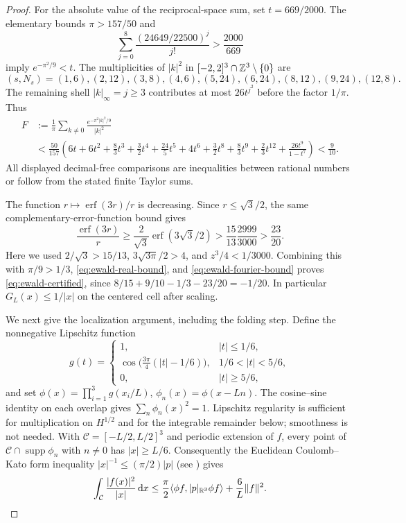 \begin{proof}
For the absolute value of the reciprocal-space sum, set $t=669/2000$.
The elementary bounds $\pi>157/50$ and
\[
 \sum_{j=0}^8\frac{(24649/22500)^j}{j!}>\frac{2000}{669}
\]
imply $e^{-\pi^2/9}<t$.  The multiplicities of $|k|^2$ in
$[-2,2]^3\cap\mathbb Z^3\setminus\{0\}$ are
\[
 (s,N_s)=(1,6),(2,12),(3,8),(4,6),(5,24),
          (6,24),(8,12),(9,24),(12,8).
\]
The remaining shell $|k|_\infty=j\ge3$ contributes at most $26t^{j^2}$
before the factor $1/\pi$.  Thus
\begin{align}
 F&:=\frac1\pi\sum_{k\ne0}\frac{e^{-\pi^2|k|^2/9}}{|k|^2}\nonumber\\
 &<\frac{50}{157}\left(
 6t+6t^2+\frac83t^3+\frac32t^4+\frac{24}{5}t^5+4t^6
 +\frac32t^8+\frac83t^9+\frac23t^{12}
 +\frac{26t^9}{1-t^7}\right)<\frac9{10}.
 \label{eq:ewald-fourier-bound}
\end{align}
All displayed decimal-free comparisons are inequalities between rational
numbers or follow from the stated finite Taylor sums.

The function $r\mapsto\operatorname{erf}(3r)/r$ is decreasing.  Since
$r\le\sqrt3/2$, the same complementary-error-function bound gives
\[
 \frac{\operatorname{erf}(3r)}r
 \ge\frac2{\sqrt3}\operatorname{erf}(3\sqrt3/2)
 >\frac{15}{13}\frac{2999}{3000}>\frac{23}{20}.
\]
Here we used $2/\sqrt3>15/13$,
$3\sqrt{3\pi}/2>4$, and $z^3/4<1/3000$.
Combining this with $\pi/9>1/3$,
\eqref{eq:ewald-real-bound}, and \eqref{eq:ewald-fourier-bound} proves
\eqref{eq:ewald-certified}, since
$8/15+9/10-1/3-23/20=-1/20$.  In particular
$G_L(x)\le1/|x|$ on the centered cell after scaling.

We next give the localization argument, including the folding step.  Define
the nonnegative Lipschitz function
\[
 g(t)=\begin{cases}
 1,&|t|\le1/6,\\
 \cos\bigl(\frac{3\pi}4(|t|-1/6)\bigr),&1/6<|t|<5/6,\\
 0,&|t|\ge5/6,
 \end{cases}
\]
and set $\phi(x)=\prod_{i=1}^3g(x_i/L)$,
$\phi_n(x)=\phi(x-Ln)$.  The cosine--sine identity on each overlap gives
$\sum_n\phi_n(x)^2=1$.  Lipschitz regularity is sufficient for multiplication
on $H^{1/2}$ and for the integrable remainder below; smoothness is not needed.
With $\mathcal C=[-L/2,L/2]^3$ and periodic extension of $f$, every point of
$\mathcal C\cap\operatorname{supp}\phi_n$ with $n\ne0$ has $|x|\ge L/6$.
Consequently the Euclidean Coulomb--Kato form inequality
$|x|^{-1}\le(\pi/2)|p|$ (see \cite{Herbst1977}) gives
\begin{equation}
 \int_{\mathcal C}\frac{|f(x)|^2}{|x|}\,\mathrm d x
 \le\frac\pi2\langle\phi f,|p|_{\mathbb R^3}\phi f\rangle
       +\frac6L\|f\|^2.
 \label{eq:pkato-local}
\end{equation}


\end{proof}
